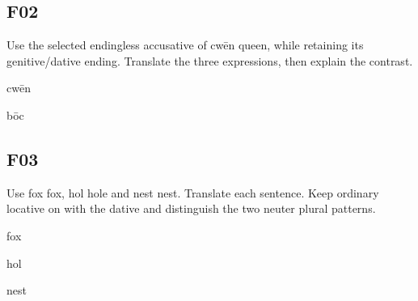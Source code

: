 \subsection*{F02}

Use the selected endingless accusative of cwēn queen, while retaining its genitive/\allowbreak{}dative ending. Translate the three expressions, then explain the contrast.

cwēn

bōc





\subsection*{F03}

Use fox fox, hol hole and nest nest. Translate each sentence. Keep ordinary locative on with the dative and distinguish the two neuter plural patterns.

fox

hol

nest



